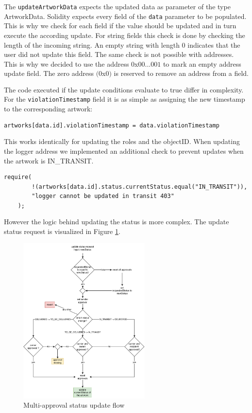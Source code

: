 

The \texttt{updateArtworkData} expects the updated data as parameter of the type ArtworkData. Solidity expects every field of the \texttt{data} parameter to be populated. This is why we check for each field if the value should be updated and in turn execute the according update. For string fields this check is done by checking the length of the incoming string. An empty string with length $0$ indicates that the user did not update this field. The same check is not possible with addresses. This is why we decided to use the address $0$x$00...001$ to mark an empty address update field. The zero address $(0$x$0)$ is reserved to remove an address from a field.

The code executed if the update conditions evaluate to true differ in complexity. For the \texttt{violationTimestamp} field it is as simple as assigning the new timestamp to the corresponding artwork: 
\begin{lstlisting}[language=Solidity]
    artworks[data.id].violationTimestamp = data.violationTimestamp
\end{lstlisting}
This works identically for updating the roles and the objectID. When updating the logger address we implemented an additional check to prevent updates when the artwork is IN\_TRANSIT.
\begin{lstlisting}[language=Solidity]
    require(
        !(artworks[data.id].status.currentStatus.equal("IN_TRANSIT")),
        "logger cannot be updated in transit 403"
    );
\end{lstlisting}

However the logic behind updating the status is more complex. The update status request is visualized in Figure \ref{fig:update_status}.
\begin{figure}
    \centering
    \includegraphics[width=0.59\textwidth, keepaspectratio]{diagrams/update_status.drawio.pdf}
    \caption{Multi-approval status update flow}
    \label{fig:update_status}
\end{figure}

